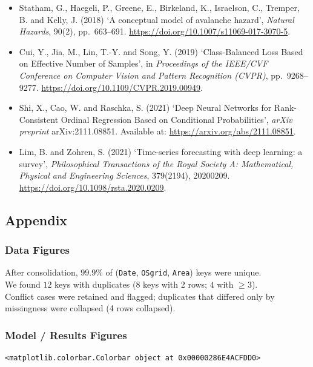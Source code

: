 \documentclass[
  letterpaper,
  DIV=11,
  numbers=noendperiod]{scrartcl}
\begin{document}
\begin{itemize}
\item
  Statham, G., Haegeli, P., Greene, E., Birkeland, K., Israelson, C.,
  Tremper, B. and Kelly, J. (2018) `A conceptual model of avalanche
  hazard', \emph{Natural Hazards}, 90(2), pp.~663--691.
  \url{https://doi.org/10.1007/s11069-017-3070-5}.
\item
  Cui, Y., Jia, M., Lin, T.-Y. and Song, Y. (2019) `Class-Balanced Loss
  Based on Effective Number of Samples', in \emph{Proceedings of the
  IEEE/CVF Conference on Computer Vision and Pattern Recognition
  (CVPR)}, pp.~9268--9277.
  \url{https://doi.org/10.1109/CVPR.2019.00949}.
\item
  Shi, X., Cao, W. and Raschka, S. (2021) `Deep Neural Networks for
  Rank-Consistent Ordinal Regression Based on Conditional
  Probabilities', \emph{arXiv preprint} arXiv:2111.08851. Available at:
  \url{https://arxiv.org/abs/2111.08851}.
\item
  Lim, B. and Zohren, S. (2021) `Time-series forecasting with deep
  learning: a survey', \emph{Philosophical Transactions of the Royal
  Society A: Mathematical, Physical and Engineering Sciences},
  379(2194), 20200209. \url{https://doi.org/10.1098/rsta.2020.0209}.
\end{itemize}

\subsection{Appendix}\label{appendix}

\subsubsection{Data Figures}\label{data-figures}

After consolidation, \(99.9\%\) of (\texttt{Date}, \texttt{OSgrid},
\texttt{Area}) keys were unique.\\
We found \(12\) keys with duplicates (\(8\) keys with 2 rows; \(4\) with
\(\geq 3\)).\\
Conflict cases were retained and flagged; duplicates that differed only
by missingness were collapsed (4 rows collapsed).

\subsubsection{Model / Results Figures}\label{model-results-figures}

\begin{verbatim}
<matplotlib.colorbar.Colorbar object at 0x00000286E4ACFDD0>
\end{verbatim}
\end{document}
